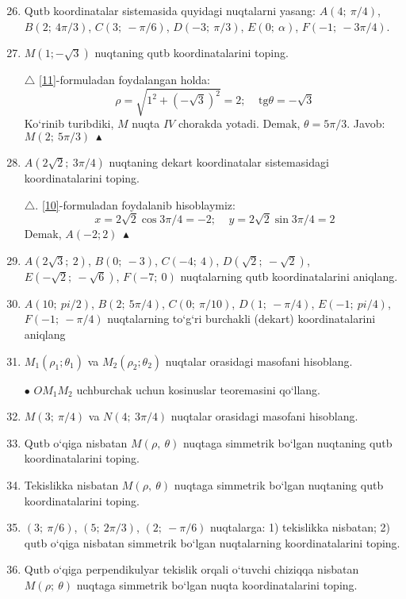 \begin{enumerate}
	\setcounter{enumi}{25}
	\item Qutb koordinatalar sistemasida quyidagi nuqtalarni yasang: $A(4;\ \pi/4)$, $B(2;\ 4\pi/3)$, $C(3;\ -\pi/6)$, $D(-3;\ \pi/3)$, $E(0;\ \alpha)$, $F(-1;\ -3\pi/4)$.
	
	\item $M(1;-\sqrt{3})$ nuqtaning qutb koordinatalarini toping.
	
	$\triangle$ \eqref{11}-formuladan foydalangan holda:
	$$\rho=\sqrt{1^{2}+\left(-\sqrt{3}\right)^{2}}=2;\ \ \ \ \ \textrm{tg}\theta=-\sqrt{3}$$
	Ko`rinib turibdiki, $M$ nuqta $IV$ chorakda yotadi. Demak, $\theta=5\pi/3$.
	Javob: $M(2;\ 5\pi/3)\  \blacktriangle$
	
	\item $A(2\sqrt{2};\ 3\pi/4)$ nuqtaning dekart koordinatalar sistemasidagi koordinatalarini toping.
	
	$\triangle$. \eqref{10}-formuladan foydalanib hisoblaymiz:
	$$x=2\sqrt{2}\cos{3\pi/4}=-2;\ \ \ \ \ y=2\sqrt{2}\sin{3\pi/4}=2$$
	Demak, $A(-2;2)\ \blacktriangle$
	
	\item $A(2\sqrt{3};\ 2)$, $B(0;\ -3)$, $C(-4;\ 4)$, $D(\sqrt{2};\ -\sqrt{2})$, $E(-\sqrt{2};\ -\sqrt{6})$, $F(-7;\ 0)$ nuqtalarning qutb koordinatalarini aniqlang.
	
	\item $A(10;\ pi/2)$, $B(2;\ 5\pi/4)$, $C(0;\ \pi/10)$, $D(1;\ -\pi/4)$, $E(-1;\ pi/4)$, $F(-1;\ -\pi/4)$ nuqtalarning to`g`ri burchakli (dekart) koordinatalarini aniqlang
	
	\item $M_{1}(\rho_{1};\theta_{1})$ va $M_{2}(\rho_{2};\theta_{2})$ nuqtalar orasidagi masofani hisoblang.
	
	$\bullet$ $OM_{1}M_{2}$ uchburchak uchun kosinuslar teoremasini qo`llang.
	
	\item $M(3; \ \pi/4)$ va $N(4; \ 3\pi/4)$ nuqtalar orasidagi masofani hisoblang.
	
	\item Qutb o`qiga nisbatan $M(\rho,\ \theta)$ nuqtaga simmetrik bo`lgan nuqtaning qutb koordinatalarini toping.
	
	\item Tekislikka nisbatan $M(\rho,\ \theta)$ nuqtaga simmetrik bo`lgan nuqtaning qutb koordinatalarini toping.
	
	\item $(3;\ \pi/6)$, $(5;\ 2\pi/3)$, $(2;\ -\pi/6)$ nuqtalarga: 1) tekislikka nisbatan; 2) qutb o`qiga nisbatan simmetrik bo`lgan nuqtalarning koordinatalarini toping.
	
	\item Qutb o`qiga perpendikulyar tekislik orqali o`tuvchi chiziqqa nisbatan $M(\rho;\ \theta)$ nuqtaga simmetrik bo`lgan nuqta koordinatalarini toping.		
\end{enumerate}

